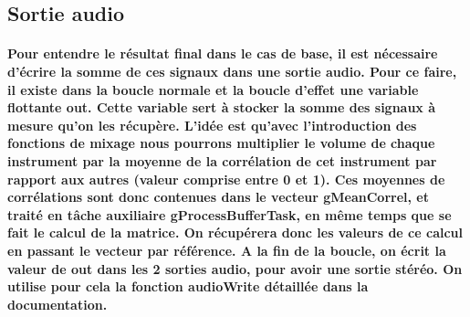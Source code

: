 \documentclass[a4paper]{article}
\begin{document}
\subsection{Sortie audio} \paragraph{Pour entendre le résultat final dans le cas
de base, il est nécessaire d’écrire la somme de ces signaux dans une sortie
audio. Pour ce faire, il existe dans la boucle normale et la boucle d’effet une
variable flottante out. Cette variable sert à stocker la somme des signaux à
mesure qu’on les récupère. L'idée est qu'avec l'introduction des fonctions de
mixage nous pourrons multiplier le volume de chaque instrument par la moyenne de
la corrélation de cet instrument par rapport aux autres (valeur comprise entre 0
et 1). Ces moyennes de corrélations sont donc contenues dans le vecteur
gMeanCorrel, et traité en tâche auxiliaire gProcessBufferTask, en même temps que
se fait le calcul de la matrice. On récupérera donc les valeurs de ce calcul en
passant le vecteur par référence. A la fin de la boucle, on écrit la valeur de
out dans les 2 sorties audio, pour avoir une sortie stéréo. On utilise pour cela
la fonction audioWrite détaillée dans la documentation.}
\end{document}
